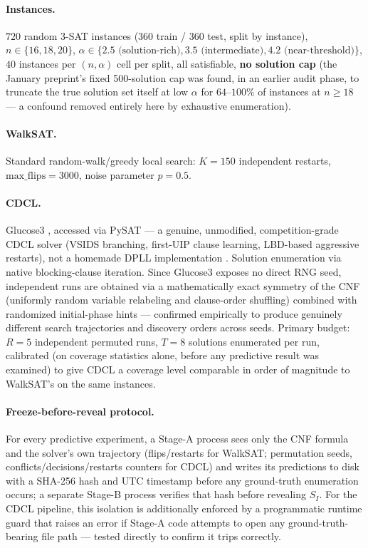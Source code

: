 \documentclass[11pt]{article}
\theoremstyle{definition}
\theoremstyle{remark}
\newcommand{\Shat}{S_I}
\begin{document}
\paragraph{Instances.} $720$ random 3-SAT instances ($360$ train / $360$ test, split by instance), $n \in \{16,18,20\}$, $\alpha \in \{2.5 \text{ (solution-rich)}, 3.5 \text{ (intermediate)}, 4.2 \text{ (near-threshold)}\}$, $40$ instances per $(n,\alpha)$ cell per split, all satisfiable, \textbf{no solution cap} (the January preprint's fixed 500-solution cap was found, in an earlier audit phase, to truncate the true solution set itself at low $\alpha$ for $64$--$100\%$ of instances at $n \ge 18$ --- a confound removed entirely here by exhaustive enumeration).

\paragraph{WalkSAT.} Standard random-walk/greedy local search: $K=150$ independent restarts, $\mathrm{max\_flips}=3000$, noise parameter $p=0.5$.

\paragraph{CDCL.} Glucose3 \citep{audemard2009predicting}, accessed via PySAT \citep{ignatiev2018pysat} --- a genuine, unmodified, competition-grade CDCL solver (VSIDS branching, first-UIP clause learning, LBD-based aggressive restarts), not a homemade DPLL implementation \citep{davis1962machine}. Solution enumeration via native blocking-clause iteration. Since Glucose3 exposes no direct RNG seed, independent runs are obtained via a mathematically exact symmetry of the CNF (uniformly random variable relabeling and clause-order shuffling) combined with randomized initial-phase hints --- confirmed empirically to produce genuinely different search trajectories and discovery orders across seeds. Primary budget: $R=5$ independent permuted runs, $T=8$ solutions enumerated per run, calibrated (on coverage statistics alone, before any predictive result was examined) to give CDCL a coverage level comparable in order of magnitude to WalkSAT's on the same instances.

\paragraph{Freeze-before-reveal protocol.} For every predictive experiment, a Stage-A process sees only the CNF formula and the solver's own trajectory (flips/restarts for WalkSAT; permutation seeds, conflicts/decisions/restarts counters for CDCL) and writes its predictions to disk with a SHA-256 hash and UTC timestamp before any ground-truth enumeration occurs; a separate Stage-B process verifies that hash before revealing $\Shat$. For the CDCL pipeline, this isolation is additionally enforced by a programmatic runtime guard that raises an error if Stage-A code attempts to open any ground-truth-bearing file path --- tested directly to confirm it trips correctly.
\end{document}
